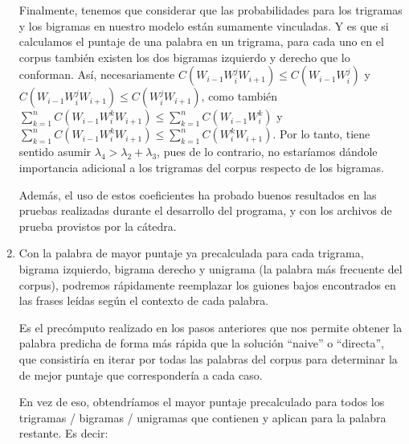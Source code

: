 \documentclass[a4paper]{article}
\begin{document}
\begin{enumerate}
        Finalmente, tenemos que considerar que las probabilidades para los trigramas y los bigramas en nuestro modelo están sumamente vinculadas. Y es que si calculamos el puntaje de una palabra en un trigrama, para cada uno en el corpus también existen los dos bigramas izquierdo y derecho que lo conforman. Así, necesariamente $C(W_{i-1} W_i^j W_{i+1}) \leq C(W_{i-1} W_i^j)$ y $C(W_{i-1} W_i^j W_{i+1}) \leq C(W_i^j W_{i+1})$, como también $\sum_{k=1}^n C(W_{i-1} W_i^k W_{i+1}) \leq \sum_{k=1}^n C(W_{i-1} W_i^k)$ y $\sum_{k=1}^n C(W_{i-1} W_i^k W_{i+1}) \leq \sum_{k=1}^n C(W_i^k W_{i+1})$. Por lo tanto, tiene sentido asumir $\lambda_4 > \lambda_2 + \lambda_3$, pues de lo contrario, no estaríamos dándole importancia adicional a los trigramas del corpus respecto de los bigramas.

        Además, el uso de estos coeficientes ha probado buenos resultados en las pruebas realizadas durante el desarrollo del programa, y con los archivos de prueba provistos por la cátedra.

    \item Con la palabra de mayor puntaje ya precalculada para cada trigrama, bigrama izquierdo, bigrama derecho y unigrama (la palabra más frecuente del corpus), podremos rápidamente reemplazar los guiones bajos encontrados en las frases leídas según el contexto de cada palabra.
    
        Es el precómputo realizado en los pasos anteriores que nos permite obtener la palabra predicha de forma más rápida que la solución ``naive'' o ``directa'', que consistiría en iterar por todas las palabras del corpus para determinar la de mejor puntaje que correspondería a cada caso.

        En vez de eso, obtendríamos el mayor puntaje precalculado para todos los trigramas / bigramas / unigramas que contienen y aplican para la palabra restante. Es decir:


\end{enumerate}
\end{document}
